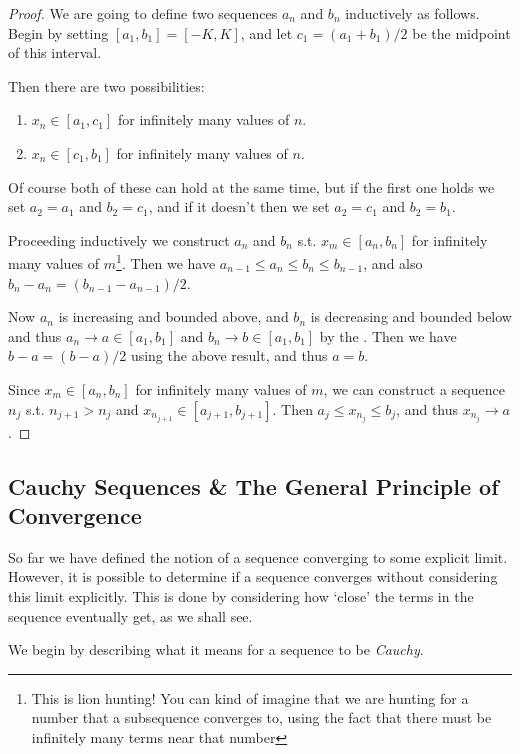 \begin{proof}
	We are going to define two sequences $a_n$ and $b_n$ inductively as follows. Begin by setting $[a_1, b_1] = [-K, K]$, and let $c_1 = (a_1 + b_1)/2$ be the midpoint of this interval.

	Then there are two possibilities:
	\begin{enumerate}
		\item $x_n \in [a_1, c_1]$ for infinitely many values of $n$.
		\item $x_n \in [c_1, b_1]$ for infinitely many values of $n$.
	\end{enumerate}
	Of course both of these can hold at the same time, but if the first one holds we set $a_2 = a_1$ and $b_2 = c_1$, and if it doesn't then we set $a_2 = c_1$ and $b_2 = b_1$.

	Proceeding inductively we construct $a_n$ and $b_n$ s.t. $x_m \in [a_n, b_n]$ for infinitely many values of $m$\footnote{This is lion hunting! You can kind of imagine that we are hunting for a number that a subsequence converges to, using the fact that there must be infinitely many terms near that number}.
	Then we have $a_{n - 1} \leq a_n \leq b_n \leq b_{n - 1}$, and also $b_n - a_n = (b_{n - 1} - a_{n - 1})/2$. 

	Now $a_n$ is increasing and bounded above, and $b_n$ is decreasing and bounded below and thus $a_n \rightarrow a \in [a_1, b_1]$ and $b_n \rightarrow b \in [a_1, b_1]$ by the .
	Then we have $b - a = (b - a)/2$ using the above result, and thus $a = b$.

	Since $x_m \in [a_n, b_n]$ for infinitely many values of $m$, we can construct a sequence $n_j$ s.t. $n_{j + 1} > n_j$ and $x_{n_{j + 1}} \in [a_{j + 1}, b_{j + 1}]$. Then $a_j \leq x_{n_j} \leq b_j$, and thus $x_{n_j} \rightarrow a$.
\end{proof}

\subsection{Cauchy Sequences \& The General Principle of Convergence}

So far we have defined the notion of a sequence converging to some explicit limit. However, it is possible to determine if a sequence converges without considering this limit explicitly. This is done by considering how `close' the terms in the sequence eventually get, as we shall see.

We begin by describing what it means for a sequence to be \emph{Cauchy}.

